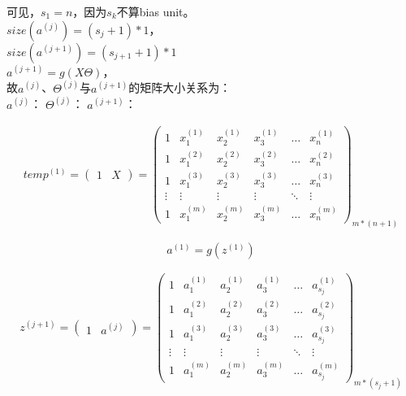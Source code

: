 可见，$s_1 = n$，因为$s_k$不算bias unit。\\
$size(a^{(j)}) = (s_j+1)*1$，\\
$size(a^{(j+1)}) = (s_{j+1}+1)*1$\\ 
$a^{(j+1)} = g(X\Theta)$，\\
故$a^{(j)}$、$\Theta^{(j)}$与$a^{(j+1)}$的矩阵大小关系为：\\
$a^{(j)}$：
$\Theta^{(j)}$：
$a^{(j+1)}$：


\newpage

\begin{equation}\begin{aligned}
	temp^{(1)} = \left(\begin{matrix} 1 & X \end{matrix}\right)
	= \left( \begin{matrix}
			1 & x_1^{(1)} & x_2^{(1)} & x_3^{(1)} & \dots & x_n^{(1)} \\
			1 & x_1^{(2)} & x_2^{(2)} & x_3^{(2)} & \dots & x_n^{(2)} \\
			1 & x_1^{(3)} & x_2^{(3)} & x_3^{(3)} & \dots & x_n^{(3)} \\
			\vdots & \vdots    & \vdots    & \vdots    & \ddots & \vdots   \\
			1 & x_1^{(m)} & x_2^{(m)} & x_3^{(m)} & \dots & x_n^{(m)}
		\end{matrix}\right)_{m*(n+1)}
\end{aligned}\end{equation}


\begin{equation}
	a^{(1)} = g(z^{(1)})
\end{equation}

\begin{equation}\begin{aligned}
	z^{(j+1)} = \left(\begin{matrix} 1 & a^{(j)} \end{matrix}\right)
	= \left( \begin{matrix}
			1 & a_1^{(1)} & a_2^{(1)} & a_3^{(1)} & \dots & a_{s_j}^{(1)} \\
			1 & a_1^{(2)} & a_2^{(2)} & a_3^{(2)} & \dots & a_{s_j}^{(2)} \\
			1 & a_1^{(3)} & a_2^{(3)} & a_3^{(3)} & \dots & a_{s_j}^{(3)} \\
			\vdots & \vdots    & \vdots    & \vdots    & \ddots & \vdots   \\
			1 & a_1^{(m)} & a_2^{(m)} & a_3^{(m)} & \dots & a_{s_j}^{(m)}
		\end{matrix}\right)_{m*(s_j+1)}
\end{aligned}\end{equation}

